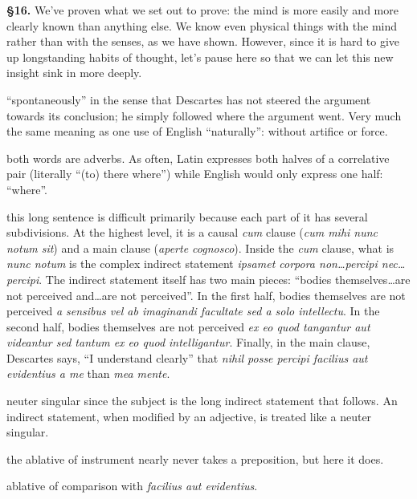 \textbf{§16.} We've proven what we set out to prove: the mind is more easily and more clearly known than anything else. We know even physical things with the mind rather than with the senses, as we have shown. However, since it is hard to give up longstanding habits of thought, let's pause here so that we can let this new insight sink in more deeply.

 ``spontaneously'' in the sense that Descartes has not steered the argument towards its conclusion; he simply followed where the argument went. Very much the same meaning as one use of English ``naturally'': without artifice or force.

 both words are adverbs. As often, Latin expresses both halves of a correlative pair (literally ``(to) there where'') while English would only express one half: ``where''.

 this long sentence is difficult primarily because each part of it has several subdivisions. At the highest level, it is a causal \textit{cum} clause (\textit{cum mihi nunc notum sit}) and a main clause (\textit{aperte cognosco}). Inside the \textit{cum} clause, what is \textit{nunc notum} is the complex indirect statement \textit{ipsamet corpora non\dots percipi nec\dots percipi}. The indirect statement itself has two main pieces: ``bodies themselves\dots are not perceived and\dots are not perceived''. In the first half, bodies themselves are not perceived \textit{a sensibus vel ab imaginandi facultate sed a solo intellectu}. In the second half, bodies themselves are not perceived \textit{ex eo quod tangantur aut videantur sed tantum ex eo quod intelligantur}. Finally, in the main clause, Descartes says, ``I understand clearly'' that \textit{nihil posse percipi facilius aut evidentius a me} than \textit{mea mente}.

 neuter singular since the subject is the long indirect statement that follows. An indirect statement, when modified by an adjective, is treated like a neuter singular.

 the ablative of instrument nearly never takes a preposition, but here it does.

 ablative of comparison with \textit{facilius aut evidentius}.

